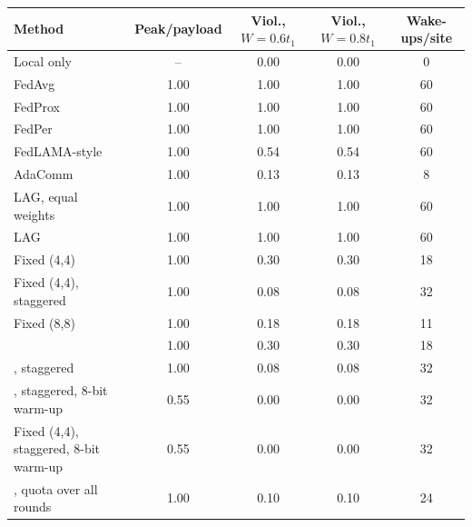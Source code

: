 \begin{tabular}{@{}lcccc@{}}
\toprule
Method & Peak/payload & Viol., $W=0.6t_1$ & Viol., $W=0.8t_1$ & Wake-ups/site\\
\midrule
Local only & -- & 0.00 & 0.00 & 0\\
FedAvg & 1.00 & 1.00 & 1.00 & 60\\
FedProx & 1.00 & 1.00 & 1.00 & 60\\
FedPer & 1.00 & 1.00 & 1.00 & 60\\
FedLAMA-style & 1.00 & 0.54 & 0.54 & 60\\
AdaComm & 1.00 & 0.13 & 0.13 & 8\\
LAG, equal weights & 1.00 & 1.00 & 1.00 & 60\\
LAG & 1.00 & 1.00 & 1.00 & 60\\
Fixed (4,4) & 1.00 & 0.30 & 0.30 & 18\\
Fixed (4,4), staggered & 1.00 & 0.08 & 0.08 & 32\\
Fixed (8,8) & 1.00 & 0.18 & 0.18 & 11\\
\tierfed{} & 1.00 & 0.30 & 0.30 & 18\\
\tierfed{}, staggered & 1.00 & 0.08 & 0.08 & 32\\
\tierfed{}, staggered, 8-bit warm-up & 0.55 & 0.00 & 0.00 & 32\\
Fixed (4,4), staggered, 8-bit warm-up & 0.55 & 0.00 & 0.00 & 32\\
\tierfed{}, quota over all rounds & 1.00 & 0.10 & 0.10 & 24\\
\bottomrule
\end{tabular}
